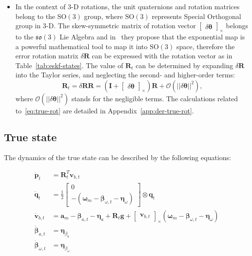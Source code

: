 \begin{itemize}
    \item 
    In the context of 3-D rotations, the unit quaternions and rotation matrices belong to the $\mathrm{SO}(3)$ group, where $\mathrm{SO}(3)$ represents Special Orthogonal group in 3-D. The skew-symmetric matrix of rotation vector $\begin{bmatrix} \delta\boldsymbol{\theta} \end{bmatrix}_\times$ belongs to the $\mathfrak{so}(3)$ Lie Algebra and in~\cite{quaternion-eskf} they propose that the exponential map is a powerful mathematical tool to map it into $\mathrm{SO}(3)$ space, therefore the error rotation matrix $\delta\mathbf{R}$ can be expressed with the rotation vector as in Table~\ref{tab:eskf-states}. The value of $\mathbf{R}_t$ can be determined by expanding $\delta\mathbf{R}$ into the Taylor series, and neglecting the second- and higher-order terms:
    \begin{equation}
         \mathbf{R}_t=\delta\mathbf{R}\mathbf{R}=\left(\mathbf{I} +\begin{bmatrix} \delta\boldsymbol{\theta} \end{bmatrix}_\times\right) \mathbf{R} + \mathcal{O}(||\delta\boldsymbol{\theta}||^2),
    \label{eq:true-rot}
    \end{equation}    
    where $\mathcal{O}(||\delta\boldsymbol{\theta}||^2)$ stands for the negligible terms. The calculations related to~\eqref{eq:true-rot} are detailed in Appendix~\ref{app:der-true-rot}.
\end{itemize} 


\subsection*{True state}

The dynamics of the true state can be described by the following equations:

\begin{subequations}
    \begin{align}
        \dot{\mathbf{p}}_{t}&=\mathbf{R}_t^T \mathbf{v}_{b,t} \\
        \dot{\mathbf{q}}_{t}&=\frac{1}{2}\begin{bmatrix}0\\ -(\boldsymbol{\omega}_m-\boldsymbol{\beta}_{\omega, t}-\boldsymbol{\eta}_{\omega}) \end{bmatrix}\otimes \mathbf{q}_{t} \label{subeq:true-q} \\
        \dot{\mathbf{v}}_{b,t}&=\mathbf{a}_m-\boldsymbol{\beta}_{a,t}-\boldsymbol{\eta}_a +\mathbf{R}_t\mathbf{g} + \begin{bmatrix}\mathbf{v}_{b,t} \end{bmatrix}_{\times}(\boldsymbol{\omega}_m-\boldsymbol{\beta}_{\omega,t} -\boldsymbol{\eta}_\omega) \label{subeq:true-vb}\\
        \dot{\boldsymbol{\beta}}_{a,t}&=\boldsymbol{\eta}_{\beta_a} \label{subeq:true-ba}\\
        \dot{\boldsymbol{\beta}}_{\omega,t}&=\boldsymbol{\eta}_{\beta_\omega} \label{subeq:true-bw}
    \end{align}\label{eq:true-state}
\end{subequations}

